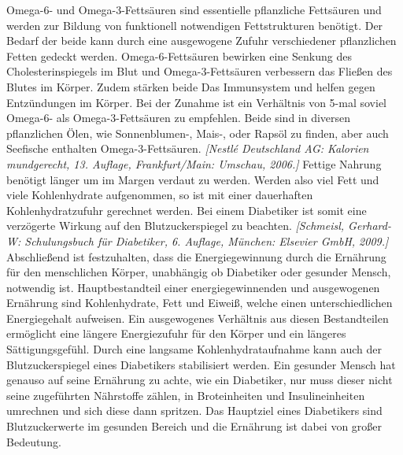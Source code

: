 \documentclass[a4paper,11pt]{article}%
\renewcommand{\\}{\vspace*{0.5\baselineskip} \newline}
\begin{document}
		Omega-6- und Omega-3-Fettsäuren sind essentielle pflanzliche Fettsäuren und werden zur Bildung von funktionell notwendigen Fettstrukturen benötigt. Der Bedarf der beide kann durch eine ausgewogene Zufuhr verschiedener pflanzlichen Fetten gedeckt werden. Omega-6-Fettsäuren bewirken eine Senkung des Cholesterinspiegels im Blut und Omega-3-Fettsäuren verbessern das Fließen des Blutes im Körper. Zudem stärken beide Das Immunsystem und helfen gegen Entzündungen im Körper. Bei der Zunahme ist ein Verhältnis von 5-mal soviel Omega-6- als Omega-3-Fettsäuren zu empfehlen. Beide sind in diversen pflanzlichen Ölen, wie Sonnenblumen-, Mais-, oder Rapsöl zu finden, aber auch Seefische enthalten Omega-3-Fettsäuren. \emph{[Nestlé Deutschland AG: Kalorien mundgerecht, 13. Auflage, Frankfurt/Main: Umschau, 2006.]} \newline
		Fettige Nahrung benötigt länger um im Margen verdaut zu werden. Werden also viel Fett und viele Kohlenhydrate aufgenommen, so ist mit einer dauerhaften Kohlenhydratzufuhr gerechnet werden. Bei einem Diabetiker ist somit eine verzögerte Wirkung auf den Blutzuckerspiegel zu beachten. \emph{[Schmeisl, Gerhard-W: Schulungsbuch für Diabetiker, 6. Auflage, München: Elsevier GmbH, 2009.]}\\
		Abschließend ist festzuhalten, dass die Energiegewinnung durch die Ernährung für den menschlichen Körper, unabhängig ob Diabetiker oder gesunder Mensch, notwendig ist. Hauptbestandteil einer energiegewinnenden und ausgewogenen Ernährung sind Kohlenhydrate, Fett und Eiweiß, welche einen unterschiedlichen Energiegehalt aufweisen. Ein ausgewogenes Verhältnis aus diesen Bestandteilen ermöglicht eine längere Energiezufuhr für den Körper und ein längeres Sättigungsgefühl. Durch eine langsame Kohlenhydrataufnahme kann auch der Blutzuckerspiegel eines Diabetikers stabilisiert werden. Ein gesunder Mensch hat genauso auf seine Ernährung zu achte, wie ein Diabetiker, nur muss dieser nicht seine zugeführten Nährstoffe zählen, in Broteinheiten und Insulineinheiten umrechnen und sich diese dann spritzen. Das Hauptziel eines Diabetikers sind Blutzuckerwerte im gesunden Bereich und die Ernährung ist dabei von großer Bedeutung.
\end{document}
